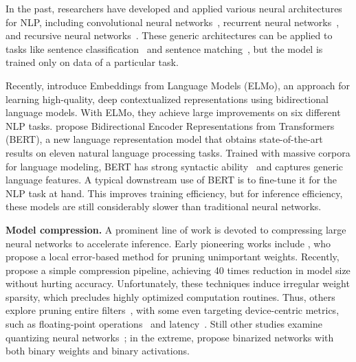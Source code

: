 \documentclass[11pt,a4paper]{article}
\newcommand{\parheader}[1]{{\smallskip \noindent \bf #1.}}
\begin{document}
In the past, researchers have developed and applied various neural architectures for NLP, including convolutional neural networks~\cite{kalchbrenner2014convolutional, kim2014convolutional}, recurrent neural networks~\cite{mikolov2010recurrent, mikolov2011extensions, graves2013generating}, and recursive neural networks~\cite{socher2010learning,socher2011parsing}.
These generic architectures can be applied to tasks like sentence classification~\cite{zhang2015character, conneau2016very} and sentence matching~\cite{wan2016deep, he2016umd}, but the model is trained only on data of a particular task. 





Recently, \citet{peters2018deep} introduce Embeddings from Language Models (ELMo), an approach for learning high-quality, deep contextualized representations using bidirectional language models. With ELMo, they achieve large improvements on six different NLP tasks.
\citet{devlin2018bert} propose Bidirectional Encoder Representations from Transformers (BERT), a new language representation model that obtains state-of-the-art results on eleven natural language processing tasks. 
Trained with massive corpora for language modeling, BERT has strong syntactic ability~\cite{goldberg2019assessing} and captures generic language features. 
A typical downstream use of BERT is to fine-tune it for the NLP task at hand.
This improves training efficiency, but for inference efficiency, these models are still considerably slower than traditional neural networks.

\parheader{Model compression}
A prominent line of work is devoted to compressing large neural networks to accelerate inference.
Early pioneering works include \citet{lecun1990optimal}, who propose a local error-based method for pruning unimportant weights.
Recently, \citet{han2015deep} propose a simple compression pipeline, achieving 40 times reduction in model size without hurting accuracy.
Unfortunately, these techniques induce irregular weight sparsity, which precludes highly optimized computation routines.
Thus, others explore pruning entire filters~\cite{li2016pruning, liu2017learning}, with some even targeting device-centric metrics, such as floating-point operations~\cite{tang2018flops} and latency~\cite{chen2018constraint}.
Still other studies examine quantizing neural networks~\cite{wu2018training}; in the extreme, \citet{courbariaux2016binarized} propose binarized networks with both binary weights and binary activations.
\end{document}

